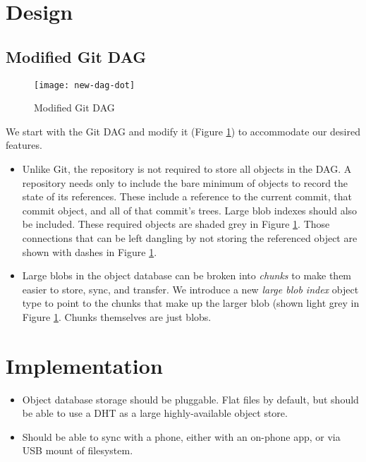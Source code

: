\documentclass[a4paper]{article}
\newcommand{\newterm}{\textit}
\begin{document}
\section{Design}\label{design}

\subsection{Modified Git DAG}

\begin{figure}[h!]
    \caption{Modified Git DAG}
    \label{fig:new-dag}
    \centering
        \texttt{[image: new-dag-dot]}
\end{figure}

We start with the Git DAG and modify it (Figure \ref{fig:new-dag}) to
accommodate our desired features.

\begin{itemize}
    \item
        Unlike Git, the repository is not required to store all objects in the
        DAG. A repository needs only to include the bare minimum of objects to
        record the state of its references. These include a reference to the
        current commit, that commit object, and all of that commit's trees.
        Large blob indexes should also be included. These required objects are
        shaded grey in Figure \ref{fig:new-dag}. Those connections that can be
        left dangling by not storing the referenced object are shown with dashes
        in Figure \ref{fig:new-dag}.
    \item
        Large blobs in the object database can be broken into \newterm{chunks}
        to make them easier to store, sync, and transfer. We introduce a new
        \newterm{large blob index} object type to point to the chunks that make
        up the larger blob (shown light grey in Figure \ref{fig:new-dag}.
        Chunks themselves are just blobs.
\end{itemize}


\section{Implementation}\label{implementation}

\begin{itemize}
  \item
    Object database storage should be pluggable. Flat files by default, but
    should be able to use a DHT as a large highly-available object store.
  \item
    Should be able to sync with a phone, either with an on-phone app, or via USB
    mount of filesystem.
\end{itemize}

% 
% 
\end{document}
